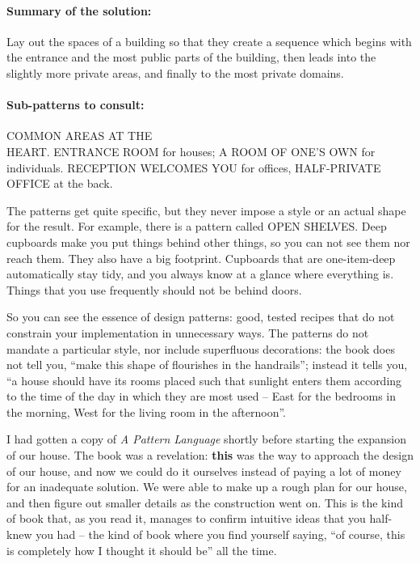 \paragraph*{Summary of the solution:}
Lay out the spaces of a building so that they create a sequence which begins
with the entrance and the most public parts of the building, then leads into the
slightly more private areas, and finally to the most private domains.

\paragraph*{Sub-patterns to consult:} COMMON AREAS AT THE\\HEART. ENTRANCE ROOM
for houses; A ROOM OF ONE'S OWN for individuals. RECEPTION WELCOMES YOU for
offices, HALF-PRIVATE OFFICE at the back.

The patterns get quite specific, but they never impose a style or an actual
shape for the result. For example, there is a pattern called OPEN SHELVES. Deep
cupboards make you put things behind other things, so you can not see them nor
reach them. They also have a big footprint. Cupboards that are one-item-deep
automatically stay tidy, and you always know at a glance where everything is.
Things that you use frequently should not be behind doors.

So you can see the essence of design patterns: good, tested recipes that do not
constrain your implementation in unnecessary ways. The patterns do not mandate
a particular style, nor include superfluous decorations: the book does not tell
you, ``make this shape of flourishes in the handrails''; instead it tells you,
``a house should have its rooms placed such that sunlight enters them according
to the time of the day in which they are most used -- East for the bedrooms in
the morning, West for the living room in the afternoon''.

I had gotten a copy of \textit{A Pattern Language} shortly before starting the
expansion of our house. The book was a revelation:  \textbf{this} was the way to
approach the design of our house, and now we could do it ourselves instead of
paying a lot of money for an inadequate solution. We were able to make up a
rough plan for our house, and then figure out smaller details as the
construction went on. This is the kind of book that, as you read it, manages to
confirm intuitive ideas that you half-knew you had -- the kind of book where you
find yourself saying, ``of course, this is completely how I thought it should
be'' all the time.


